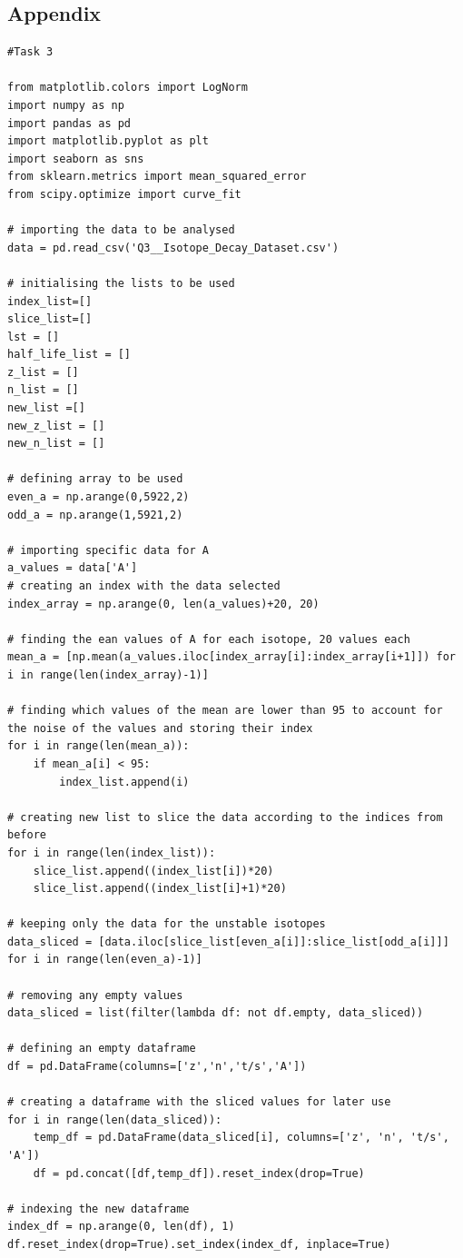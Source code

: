 \documentclass[12pt, a4paper]{article}
\begin{document}
\subsection{Appendix}
\begin{verbatim}
#Task 3

from matplotlib.colors import LogNorm
import numpy as np
import pandas as pd
import matplotlib.pyplot as plt
import seaborn as sns
from sklearn.metrics import mean_squared_error
from scipy.optimize import curve_fit

# importing the data to be analysed
data = pd.read_csv('Q3__Isotope_Decay_Dataset.csv')

# initialising the lists to be used
index_list=[]
slice_list=[]
lst = []
half_life_list = []
z_list = []
n_list = []
new_list =[]
new_z_list = []
new_n_list = []

# defining array to be used
even_a = np.arange(0,5922,2)
odd_a = np.arange(1,5921,2)

# importing specific data for A
a_values = data['A']
# creating an index with the data selected
index_array = np.arange(0, len(a_values)+20, 20)

# finding the ean values of A for each isotope, 20 values each
mean_a = [np.mean(a_values.iloc[index_array[i]:index_array[i+1]]) for i in range(len(index_array)-1)]

# finding which values of the mean are lower than 95 to account for the noise of the values and storing their index
for i in range(len(mean_a)):
    if mean_a[i] < 95:
        index_list.append(i)

# creating new list to slice the data according to the indices from before
for i in range(len(index_list)):
    slice_list.append((index_list[i])*20)
    slice_list.append((index_list[i]+1)*20)

# keeping only the data for the unstable isotopes
data_sliced = [data.iloc[slice_list[even_a[i]]:slice_list[odd_a[i]]] for i in range(len(even_a)-1)]

# removing any empty values
data_sliced = list(filter(lambda df: not df.empty, data_sliced))

# defining an empty dataframe
df = pd.DataFrame(columns=['z','n','t/s','A'])

# creating a dataframe with the sliced values for later use
for i in range(len(data_sliced)):
    temp_df = pd.DataFrame(data_sliced[i], columns=['z', 'n', 't/s', 'A'])
    df = pd.concat([df,temp_df]).reset_index(drop=True)

# indexing the new dataframe
index_df = np.arange(0, len(df), 1)
df.reset_index(drop=True).set_index(index_df, inplace=True)


\end{verbatim}
\end{document}
